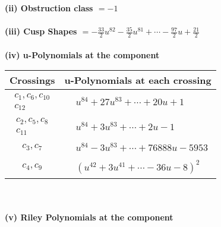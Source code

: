 \documentclass[1p]{elsarticle_modified}
\theoremstyle{definition}
\begin{document}
\flushleft \textbf{(ii) Obstruction class $= -1$}\\~\\
\flushleft \textbf{(iii) Cusp Shapes $= -\frac{33}{2} u^{82}-\frac{35}{2} u^{81}+\cdots-\frac{97}{2} u+\frac{21}{2}$}\\~\\
\newpage\renewcommand{\arraystretch}{1}
\flushleft \textbf{(iv) u-Polynomials at the component}\newline \\
\begin{tabular}{m{50pt}|m{274pt}}
Crossings & \hspace{64pt}u-Polynomials at each crossing \\
\hline $$\begin{aligned}c_{1},c_{6},c_{10}\\c_{12}\end{aligned}$$&$\begin{aligned}
&u^{84}+27 u^{83}+\cdots+20 u+1
\end{aligned}$\\
\hline $$\begin{aligned}c_{2},c_{5},c_{8}\\c_{11}\end{aligned}$$&$\begin{aligned}
&u^{84}+3 u^{83}+\cdots+2 u-1
\end{aligned}$\\
\hline $$\begin{aligned}c_{3},c_{7}\end{aligned}$$&$\begin{aligned}
&u^{84}-3 u^{83}+\cdots+76888 u-5953
\end{aligned}$\\
\hline $$\begin{aligned}c_{4},c_{9}\end{aligned}$$&$\begin{aligned}
&(u^{42}+3 u^{41}+\cdots-36 u-8)^{2}
\end{aligned}$\\
\hline
\end{tabular}\\~\\
\newpage\renewcommand{\arraystretch}{1}
\flushleft \textbf{(v) Riley Polynomials at the component}\newline \\
\end{document}
